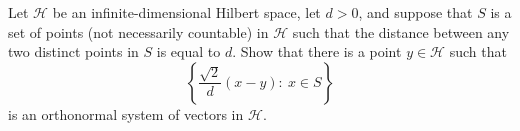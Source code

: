 Let $ \mathcal{H}$ be an infinite-dimensional Hilbert space, let $ d>0$, and suppose that $ S$ is a set of points (not necessarily countable) in $ \mathcal{H}$ such that the distance between any two distinct points in $ S$ is equal to $ d$. Show that there is a point $ y\in\mathcal{H}$ such that
\[ \left\{\frac{\sqrt{2}}{d}(x-y): \ x\in S\right\}\]
is an orthonormal system of vectors in $ \mathcal{H}$.